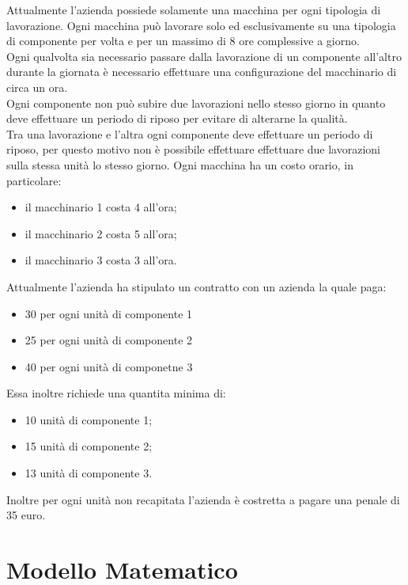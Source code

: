 \documentclass[12pt]{article}
\begin{document}
	Attualmente l'azienda possiede solamente una macchina per ogni tipologia di lavorazione. Ogni macchina può lavorare solo ed esclusivamente su una tipologia di componente per volta e per un massimo di 8 ore complessive a giorno.\\
	Ogni qualvolta sia necessario passare dalla lavorazione di un componente all'altro durante la giornata è necessario effettuare una configurazione del macchinario di circa un ora.\\
	Ogni componente non può subire due lavorazioni nello stesso giorno in quanto deve effettuare un periodo di riposo per evitare di alterarne la qualità.\\
	Tra una lavorazione e l'altra ogni componente deve effettuare un periodo di riposo, per questo motivo non è possibile effettuare effettuare due lavorazioni sulla stessa unità lo stesso giorno.
	Ogni macchina ha un costo orario, in particolare:
	\begin{itemize}
		\item il macchinario 1 costa 4 all'ora;
		\item il macchinario 2 costa 5 all'ora;
		\item il macchinario 3 costa 3 all'ora.
	\end{itemize}
	Attualmente l'azienda ha stipulato un contratto con un azienda la quale paga:
	\begin{itemize}
		\item 30 per ogni unità di componente 1
		\item 25 per ogni unità di componente 2
		\item 40 per ogni unità di componetne 3
	\end{itemize}
	Essa inoltre richiede una quantita minima di:
	\begin{itemize}
		\item 10 unità di componente 1;
		\item 15 unità di componente 2;
		\item 13 unità di componente 3.
	\end{itemize}
	Inoltre per ogni unità non recapitata l'azienda è costretta a pagare una penale di 35 euro.
	\pagebreak
	\section{Modello Matematico}
\end{document}
